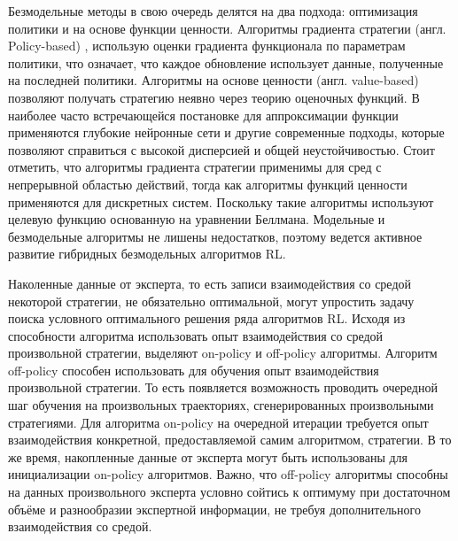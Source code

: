 Безмодельные методы в свою очередь делятся на два подхода: оптимизация политики  и на основе функции ценности. Алгоритмы градиента стратегии (англ. Policy-based) , использую оценки градиента функционала по параметрам политики, что означает, что каждое обновление использует данные, полученные на последней политики. Алгоритмы на основе ценности (англ. value-based) позволяют получать стратегию неявно через теорию оценочных функций. В наиболее часто встречающейся постановке для аппроксимации функции применяются глубокие нейронные сети и другие современные подходы, которые позволяют справиться с высокой дисперсией и общей неустойчивостью. 
Стоит отметить, что алгоритмы градиента стратегии применимы для сред с непрерывной областью действий, тогда как алгоритмы функций ценности применяются для дискретных систем. Поскольку такие алгоритмы используют целевую функцию основанную на уравнении Беллмана. Модельные и безмодельные алгоритмы не лишены недостатков, поэтому ведется активное развитие гибридных безмодельных алгоритмов RL.

Наколенные данные от эксперта, то есть записи взаимодействия со средой некоторой стратегии, не обязательно оптимальной, могут упростить задачу поиска условного оптимального решения ряда алгоритмов RL. Исходя из способности алгоритма использовать опыт взаимодействия со средой произвольной стратегии, выделяют on-policy и off-policy алгоритмы. Алгоритм off-policy способен использовать для обучения опыт взаимодействия произвольной стратегии. То есть появляется возможность проводить очередной шаг обучения на произвольных траекториях, сгенерированных произвольными стратегиями. Для алгоритма on-policy на очередной итерации требуется опыт взаимодействия конкретной, предоставляемой самим алгоритмом, стратегии. В то же время, накопленные данные от эксперта могут быть использованы для инициализации on-policy алгоритмов. Важно, что off-policy алгоритмы способны на данных произвольного эксперта условно сойтись к оптимуму при достаточном объёме и разнообразии экспертной информации, не требуя дополнительного взаимодействия со средой.




